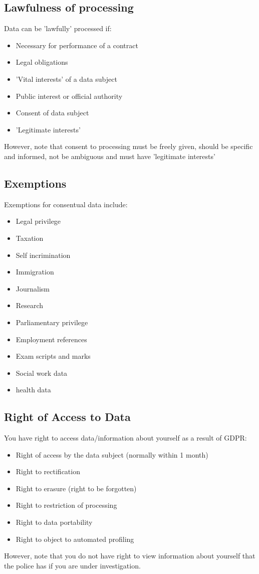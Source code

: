 \documentclass[a4paper]{article}
\theoremstyle{plain}
\theoremstyle{definition}
\theoremstyle{remark}
\begin{document}
\subsection{Lawfulness of processing}
Data can be 'lawfully' processed if:
\begin{itemize}
	\item Necessary for performance of a contract
	\item Legal obligations
	\item 'Vital interests' of a data subject
	\item Public interest or official authority
	\item Consent of data subject
	\item 'Legitimate interests'
\end{itemize}
However, note that consent to processing must be freely given, should be specific and informed, not be ambiguous and must have 'legitimate interests'
\subsection{Exemptions}
Exemptions for consentual data include:
\begin{itemize}
	\item Legal privilege
	\item Taxation
	\item Self incrimination
	\item Immigration
	\item Journalism
	\item Research
	\item Parliamentary privilege
	\item Employment references
	\item Exam scripts and marks
	\item Social work data
	\item health data
\end{itemize}
\subsection{Right of Access to Data}
You have right to access data/information about yourself as a result of GDPR:
\begin{itemize}
	\item Right of access by the data subject (normally within 1 month)
	\item Right to rectification
	\item Right to erasure (right to be forgotten)
	\item Right to restriction of processing
	\item Right to data portability
	\item Right to object to automated profiling
\end{itemize}
However, note that you do not have right to view information about yourself that the police has if you are under investigation.
\end{document}
